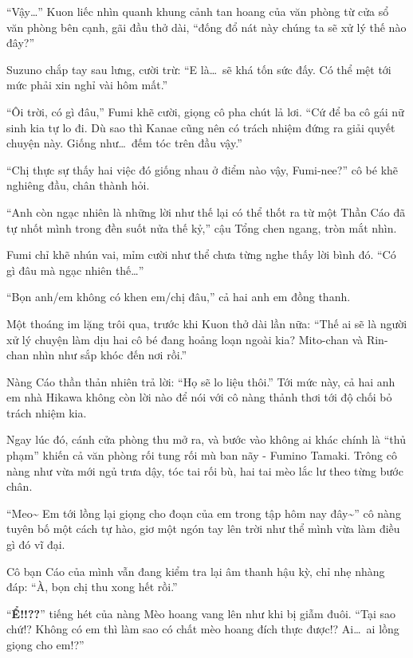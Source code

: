 \documentclass[../main.tex]{subfiles}
\begin{document}
\chrint

``Vậy\dots'' Kuon liếc nhìn quanh khung cảnh tan hoang của văn phòng từ cửa sổ văn phòng bên cạnh, gãi đầu thở dài, ``đống đổ nát này chúng ta sẽ xử lý thế nào đây?''

Suzuno chắp tay sau lưng, cười trừ: ``E là\dots\ sẽ khá tốn sức đấy. Có thể mệt tới mức phải xin nghỉ vài hôm mất.''

``Ôi trời, có gì đâu,'' Fumi khẽ cười, giọng cô pha chút lả lơi. ``Cứ để ba cô gái nữ sinh kia tự lo đi. Dù sao thì Kanae cũng nên có trách nhiệm đứng ra giải quyết chuyện này. Giống như\dots\ đếm tóc trên đầu vậy.''

``Chị thực sự thấy hai việc đó giống nhau ở điểm nào vậy, Fumi-nee?'' cô bé khẽ nghiêng đầu, chân thành hỏi.

``Anh còn ngạc nhiên là những lời như thế lại có thể thốt ra từ một Thần Cáo đã tự nhốt mình trong đền suốt nửa thế kỷ,'' cậu Tổng chen ngang, tròn mắt nhìn.

Fumi chỉ khẽ nhún vai, mỉm cười như thể chưa từng nghe thấy lời bình đó. ``Có gì đâu mà ngạc nhiên thế\dots''

``Bọn anh/em không có khen em/chị đâu,'' cả hai anh em đồng thanh.

Một thoáng im lặng trôi qua, trước khi Kuon thở dài lần nữa: ``Thế ai sẽ là người xử lý chuyện làm dịu hai cô bé đang hoảng loạn ngoài kia? Mito-chan và Rin-chan nhìn như sắp khóc đến nơi rồi.''


Nàng Cáo thần thản nhiên trả lời: ``Họ sẽ lo liệu thôi.'' Tới mức này, cả hai anh em nhà Hikawa không còn lời nào để nói với cô nàng thảnh thơi tới độ chối bỏ trách nhiệm kia.

Ngay lúc đó, cánh cửa phòng thu mở ra, và bước vào không ai khác chính là ``thủ phạm'' khiến cả văn phòng rối tung rối mù ban nãy - Fumino Tamaki. Trông cô nàng như vừa mới ngủ trưa dậy, tóc tai rối bù, hai tai mèo lắc lư theo từng bước chân.

``Meo\~{} Em tới lồng lại giọng cho đoạn của em trong tập hôm nay đây\~{}'' cô nàng tuyên bố một cách tự hào, giơ một ngón tay lên trời như thể mình vừa làm điều gì đó vĩ đại.

Cô bạn Cáo của mình vẫn đang kiểm tra lại âm thanh hậu kỳ, chỉ nhẹ nhàng đáp: ``À, bọn chị thu xong hết rồi.''

``\textbf{Ể!!??}'' tiếng hét của nàng Mèo hoang vang lên như khi bị giẫm đuôi. ``Tại sao chứ!? Không có em thì làm sao có chất mèo hoang đích thực được!? Ai\dots\ ai lồng giọng cho em!?''
\end{document}
